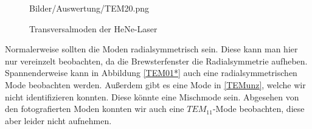 \begin{figure}[ht]
{      {Bilder/Auswertung/TEM20.png}}\quad
      \quad
      \caption{Transversalmoden der HeNe-Laser}
      \label{bild:Moden}
  \end{figure}
  Normalerweise sollten die Moden radialsymmetrisch sein. Diese kann man hier nur vereinzelt beobachten, da die Brewsterfenster die Radialsymmetrie aufheben.
  Spannenderweise kann in Abbildung \ref{TEM01*} auch eine radialsymmetrischen Mode beobachten werden. Außerdem
  gibt es eine Mode in \ref{TEMunz}, welche wir nicht identifizieren konnten. Diese könnte eine Mischmode sein. Abgesehen von den fotografierten Moden konnten wir auch eine 
  $TEM_{11}$-Mode beobachten, diese aber leider nicht aufnehmen.
  \clearpage
